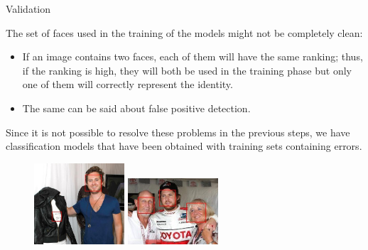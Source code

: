 \begin{tframe}{Validation}

The set of faces used in the training of the models might not be completely clean:

\begin{itemize}
\item If an image contains two faces, each of them will have the same ranking; thus, if the ranking is high, they will both be used in the training phase but only one of them will correctly represent the identity.
\item The same can be said about false positive detection.
\end{itemize}

\vspace{0.1in}

Since it is not possible to resolve these problems in the previous steps, we have classification models that have been obtained with training sets containing errors.

\begin{figure}[h]
\centering
\hspace*{\fill}
\includegraphics[width=0.30\textwidth]{images/image1a.jpg}
\hspace*{\fill}
\includegraphics[width=0.30\textwidth]{images/image2a.jpg}
\hspace*{\fill}
\end{figure}

\end{tframe}


